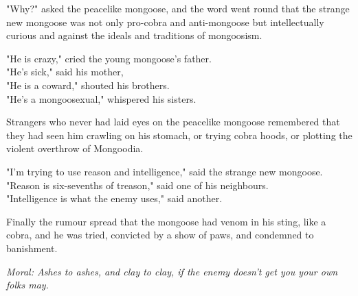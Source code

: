 \documentclass[11pt,a4paper]{article}
\begin{document}
"Why?" asked the peacelike mongoose, and the word went round that the strange new mongoose was not only pro-cobra and anti-mongoose but intellectually curious and against the ideals and traditions of mongoosism.

"He is crazy," cried the young mongoose's father. \\
"He's sick," said his mother, \\
"He is a coward," shouted his brothers. \\
"He's a mongoosexual," whispered his sisters.

Strangers who never had laid eyes on the peacelike mongoose remembered that they had seen him crawling on his stomach, or trying cobra hoods, or plotting the violent overthrow of Mongoodia.

"I'm trying to use reason and intelligence," said the strange new mongoose. \\
"Reason is six-sevenths of treason," said one of his neighbours. \\
"Intelligence is what the enemy uses," said another.

Finally the rumour spread that the mongoose had venom in his sting, like a cobra, and he was tried, convicted by a show of paws, and condemned to banishment.

\vspace{0.3cm}
\textit{Moral: Ashes to ashes, and clay to clay, if the enemy doesn't get you your own folks may.}
\vspace{0.5cm}
\end{document}
